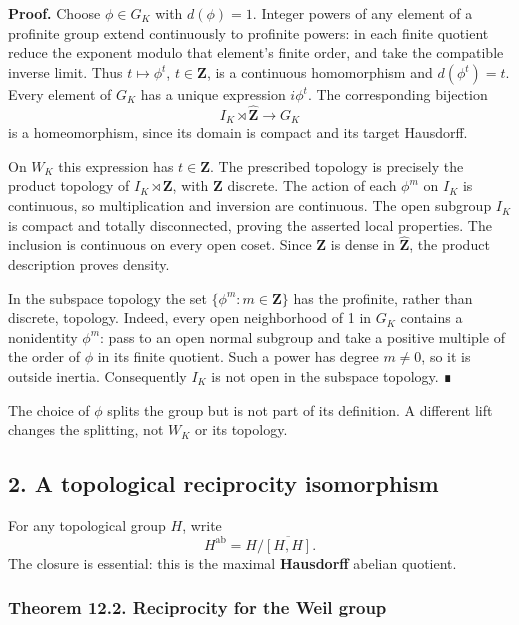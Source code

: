 \documentclass[11pt,a4paper]{article}
\begin{document}
\textbf{Proof.} Choose \(\phi\in G_K\) with \(d(\phi)=1\). Integer
powers of any element of a profinite group extend continuously to
profinite powers: in each finite quotient reduce the exponent modulo
that element's finite order, and take the compatible inverse limit. Thus
\(t\mapsto\phi^t\), \(t\in\widehat{\mathbf Z}\), is a continuous
homomorphism and \(d(\phi^t)=t\). Every element of \(G_K\) has a unique
expression \(i\phi^t\). The corresponding bijection \[
I_K\rtimes\widehat{\mathbf Z}\longrightarrow G_K
\] is a homeomorphism, since its domain is compact and its target
Hausdorff.

On \(W_K\) this expression has \(t\in\mathbf Z\). The prescribed
topology is precisely the product topology of \(I_K\rtimes\mathbf Z\),
with \(\mathbf Z\) discrete. The action of each \(\phi^m\) on \(I_K\) is
continuous, so multiplication and inversion are continuous. The open
subgroup \(I_K\) is compact and totally disconnected, proving the
asserted local properties. The inclusion is continuous on every open
coset. Since \(\mathbf Z\) is dense in \(\widehat{\mathbf Z}\), the
product description proves density.

In the subspace topology the set \(\{\phi^m:m\in\mathbf Z\}\) has the
profinite, rather than discrete, topology. Indeed, every open
neighborhood of 1 in \(G_K\) contains a nonidentity \(\phi^m\): pass to
an open normal subgroup and take a positive multiple of the order of
\(\phi\) in its finite quotient. Such a power has degree \(m\ne0\), so
it is outside inertia. Consequently \(I_K\) is not open in the subspace
topology. ∎

The choice of \(\phi\) splits the group but is not part of its
definition. A different lift changes the splitting, not \(W_K\) or its
topology.

\subsection{2. A topological reciprocity
isomorphism}\label{a-topological-reciprocity-isomorphism}

For any topological group \(H\), write \[
H^{\mathrm{ab}}=H/\overline{[H,H]}.
\] The closure is essential: this is the maximal \textbf{Hausdorff}
abelian quotient.

\subsubsection{Theorem 12.2. Reciprocity for the Weil
group}\label{theorem-12.2.-reciprocity-for-the-weil-group}
\end{document}
